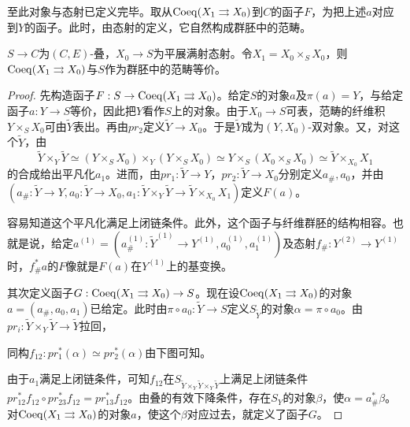 至此对象与态射已定义完毕。取从$\operatorname{Coeq}(X_1\rightrightarrows X_0)$到$C$的函子$F$，为把上述$a$对应到$Y$的函子。此时，由态射的定义，它自然构成群胚中的范畴。

\begin{proposition}
$S\to C$为$(C,E)$-叠，$X_0\to S$为平展满射态射。令$X_1=X_0\times_SX_0$，则$\operatorname{Coeq}(X_1\rightrightarrows X_0)$与$S$作为群胚中的范畴等价。
\end{proposition}

\begin{proof}
先构造函子$F:S\to\operatorname{Coeq}(X_1\rightrightarrows X_0)$。给定$S$的对象$a$及$\pi(a)=Y$，与给定函子$a:Y\to S$等价，因此把$Y$看作$S$上的对象。由于$X_0\to S$可表，范畴的纤维积$Y\times_SX_0$可由$\tilde Y$表出。再由$pr_2$定义$\tilde Y\to X_0$。于是$\tilde Y$成为$(Y,X_0)$-双对象。又，对这个$\tilde Y$，由
\[
\tilde Y\times_Y\tilde Y\simeq(Y\times_SX_0)\times_Y(Y\times_SX_0)\simeq Y\times_S(X_0\times_SX_0)\simeq\tilde Y\times_{X_0}X_1
\]
的合成给出平凡化$a_1$。进而，由$pr_1:\tilde Y\to Y$，$pr_2:\tilde Y\to X_0$分别定义$a_\#,a_0$，并由$(a_\#:\tilde Y\to Y,a_0:\tilde Y\to X_0,a_1:\tilde Y\times_Y\tilde Y\to\tilde Y\times_{X_0}X_1)$定义$F(a)$。

容易知道这个平凡化满足上闭链条件。此外，这个函子与纤维群胚的结构相容。也就是说，给定$a^{(1)}=(a_\#^{(1)}:\tilde Y^{(1)}\to Y^{(1)},a_0^{(1)},a_1^{(1)})$及态射$f_\#:Y^{(2)}\to Y^{(1)}$时，$f_\#^*a$的$F$像就是$F(a)$在$Y^{(1)}$上的基变换。

其次定义函子$G:\operatorname{Coeq}(X_1\rightrightarrows X_0)\to S$。现在设$\operatorname{Coeq}(X_1\rightrightarrows X_0)$的对象$a=(a_\#,a_0,a_1)$已给定。此时由$\pi\circ a_0:\tilde Y\to S$定义$S_{\tilde Y}$的对象$\alpha=\pi\circ a_0$。由$pr_i:\tilde Y\times_Y\tilde Y\to\tilde Y$拉回，

同构$f_{12}:pr_1^*(\alpha)\simeq pr_2^*(\alpha)$由下图可知。
\begin{center}
\end{center}

由于$a_1$满足上闭链条件，可知$f_{12}$在$S_{\tilde Y\times_Y\tilde Y\times_Y\tilde Y}$上满足上闭链条件$pr_{12}^*f_{12}\circ pr_{23}^*f_{12}=pr_{13}^*f_{12}$。由叠的有效下降条件，存在$S_Y$的对象$\beta$，使$\alpha=a_\#^*\beta$。对$\operatorname{Coeq}(X_1\rightrightarrows X_0)$的对象$a$，使这个$\beta$对应过去，就定义了函子$G$。


\end{proof}

